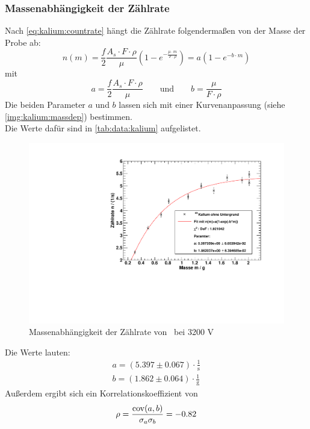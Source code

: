 \subsubsection{Massenabhängigkeit der Zählrate} %
Nach \autoref{eq:kalium:countrate} hängt die Zählrate folgendermaßen von der Masse der Probe ab:
\begin{equation}
  n(m) = \frac{f}{2} \frac{A_s \cdot F \cdot \rho}{\mu} \left( 1 - e^{- \frac{\mu \cdot m}{F \cdot \rho}} \right) = a(1-e^{-b \cdot m})
\end{equation}
mit
\begin{equation}
  a = \frac{f}{2} \frac{A_s \cdot F \cdot \rho}{\mu} \qquad \text{und} \qquad b = \frac{\mu}{F \cdot \rho}
\end{equation}
Die beiden Parameter $a$ und $b$ lassen sich mit einer Kurvenanpassung (siehe \autoref{img:kalium:massdep}) bestimmen. \\
Die Werte dafür sind in \autoref{tab:data:kalium} aufgelistet.
 
\begin{figure}[H]
\begin{center}
  \includegraphics[width=15cm]{../img/Kalium40_Massenabhaengigkeit.pdf}
  \caption[Massenabhängigkeit der Zählrate von \kalium]{Massenabhängigkeit der Zählrate von \kalium\, bei 3200 V}
  \label{img:kalium:massdep}
\end{center}
\end{figure}
Die Werte lauten:
\begin{gather}
  a = (5.397 \pm 0.067) \cdot \frac{1}{\text{s}} \\ %
  b = (1.862 \pm 0.064) \cdot \frac{1}{\text{g}} 
\end{gather}
Außerdem ergibt sich ein Korrelationskoeffizient von
\begin{equation}
  \rho = \frac{\operatorname{cov}(a, b)}{\sigma_a \sigma_b} = -0.82
\end{equation}

